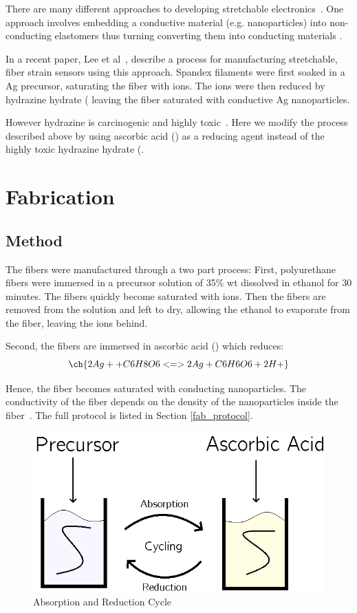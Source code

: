 \documentclass[a4paper, oneside]{discothesis}
\begin{document}
There are many different approaches to developing stretchable electronics~\cite{review_stretch}. One approach involves embedding a conductive material (e.g.  nanoparticles) into non-conducting elastomers thus turning converting them into conducting materials .

In a recent paper, Lee et al~\cite{jae2018}, describe a process for manufacturing stretchable, fiber strain sensors using this approach.
Spandex filaments were first soaked in a Ag precursor, saturating the fiber with  ions. The ions were then reduced by hydrazine hydrate ( leaving the fiber saturated with conductive Ag nanoparticles.

However hydrazine is carcinogenic and highly toxic~\cite{hydrazine_toxic}. Here we modify the process described above by using ascorbic acid () as a reducing agent instead of the highly toxic hydrazine hydrate (.

\chapter{Fabrication}
\section{Method}
The fibers were manufactured through a two part process:
First, polyurethane fibers were immersed in a precursor solution of 35\% wt  dissolved in ethanol for 30 minutes. The fibers quickly become saturated with  ions. Then the fibers are removed from the solution and left to dry, allowing the ethanol to evaporate from the fiber, leaving the  ions behind.

Second, the fibers are immersed in ascorbic acid () which reduces: \begin{equation}
\ch{2 Ag+ + C6H8O6 <=> 2 Ag + C6H6O6 + 2 H+}
\label{reduction_equation}
\end{equation}

Hence, the fiber becomes saturated with conducting  nanoparticles. The conductivity of the fiber depends on the density of the  nanoparticles inside the fiber~\cite{jae2018}. The full protocol is listed in Section \ref{fab_protocol}.

\begin{figure}[ht]
    \centering
    \includegraphics[width=.6\textwidth, keepaspectratio]{figures/cycle.png}
    \caption{Absorption and Reduction Cycle}
\end{figure}
\end{document}
